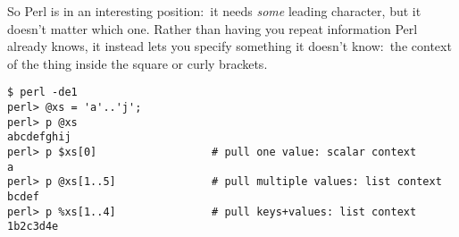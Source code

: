 \documentclass{article}
\begin{document}
So Perl is in an interesting position:~it needs {\em some} leading character,
but it doesn't matter which one. Rather than having you repeat information Perl
already knows, it instead lets you specify something it doesn't know:~the
context of the thing inside the square or curly brackets.

\begin{verbatim}
$ perl -de1
perl> @xs = 'a'..'j';
perl> p @xs
abcdefghij
perl> p $xs[0]                  # pull one value: scalar context
a
perl> p @xs[1..5]               # pull multiple values: list context
bcdef
perl> p %xs[1..4]               # pull keys+values: list context
1b2c3d4e
\end{verbatim}
\end{document}
